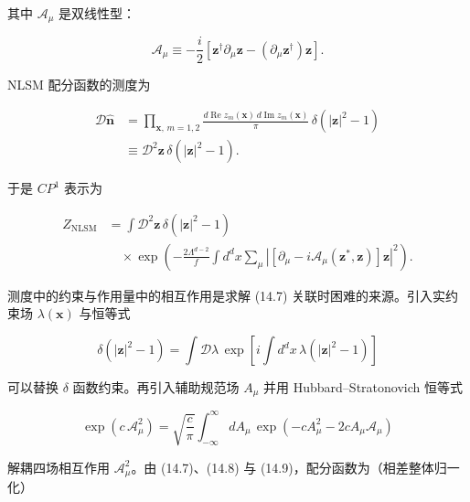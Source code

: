 其中 $\mathcal{A}_{\mu}$ 是双线性型：

\begin{equation*}
\mathcal {A} _ {\mu} \equiv - \frac {i}{2} \left[ \mathbf {z} ^ {\dagger} \partial_ {\mu} \mathbf {z} - \left( \partial_ {\mu} \mathbf {z} ^ {\dagger} \right) \mathbf {z} \right].
\tag{14.5}
\end{equation*}

NLSM 配分函数的测度为

\begin{align*}
\mathcal {D} \hat {\mathbf {n}} & = \prod_{\mathbf {x},\, m = 1,2} \frac {d \operatorname{Re} z _ {m} ( \mathbf {x} ) \, d \operatorname{Im} z _ {m} ( \mathbf {x} )}{\pi} \, \delta \left( | \mathbf {z} | ^ {2} - 1 \right)\\
& \equiv \mathcal {D} ^ {2} \mathbf {z} \, \delta \left( | \mathbf {z} | ^ {2} - 1 \right) .
\tag{14.6}
\end{align*}

于是 $CP^1$ 表示为

\begin{align*}
Z_{\mathrm{NLSM}} & = \int \mathcal {D} ^ {2} \mathbf {z} \, \delta \left( | \mathbf {z} | ^ {2} - 1 \right)\\
& \quad \times \exp \left( - \frac {2 \Lambda^ {d - 2}}{f} \int d ^ {d} x \sum_ {\mu} \left| \left[ \partial_ {\mu} - i \mathcal {A} _ {\mu} ( \mathbf {z} ^ {*}, \mathbf {z} ) \right] \mathbf {z} \right| ^ {2} \right) .
\tag{14.7}
\end{align*}

测度中的约束与作用量中的相互作用是求解 (14.7) 关联时困难的来源。引入实约束场 $\lambda(\mathbf{x})$ 与恒等式

\begin{equation*}
\delta \left( | \mathbf {z} | ^ {2} - 1 \right) = \int \mathcal {D} \lambda \, \exp \left[ i \int d ^ {d} x \, \lambda \left( | \mathbf {z} | ^ {2} - 1 \right) \right]
\tag{14.8}
\end{equation*}

可以替换 $\delta$ 函数约束。再引入辅助规范场 $A_{\mu}$ 并用 Hubbard--Stratonovich 恒等式

\begin{equation*}
\exp \left( c \, \mathcal {A} _ {\mu} ^ {2} \right) = \sqrt {\frac {c}{\pi}} \int_{- \infty} ^ {\infty} d A _ {\mu} \, \exp \left( - c A _ {\mu} ^ {2} - 2 c A _ {\mu} \mathcal {A} _ {\mu} \right)
\tag{14.9}
\end{equation*}

解耦四场相互作用 $\mathcal{A}_{\mu}^{2}$。由 (14.7)、(14.8) 与 (14.9)，配分函数为（相差整体归一化）

